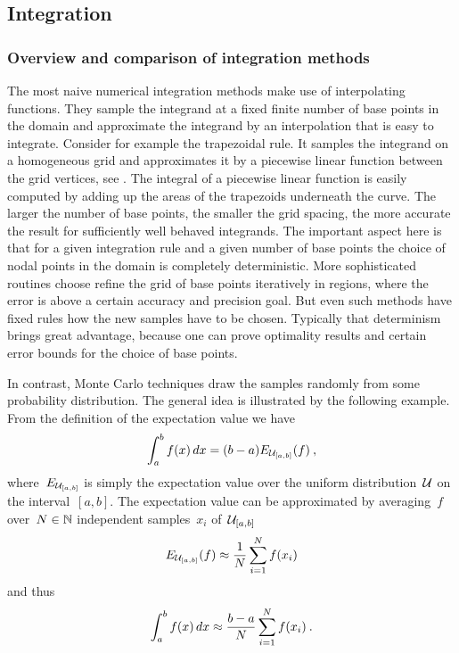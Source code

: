 \subsection{Integration}

\subsubsection{Overview and comparison of integration methods}

The most naive numerical integration methods make use of interpolating
functions. They sample the integrand at a fixed finite number of base points in
the domain and approximate the integrand by an interpolation that is easy to
integrate. Consider for example the trapezoidal rule. It samples the integrand
on a homogeneous grid and approximates it by a piecewise linear function between
the grid vertices, see . The integral of a piecewise linear
function is easily computed by adding up the areas of the trapezoids underneath
the curve. The larger the number of base points, \ie{} the smaller the grid
spacing, the more accurate the result for sufficiently well behaved integrands.
The important aspect here is that for a given integration rule and a given
number of base points the choice of nodal points in the domain is completely
deterministic. More sophisticated routines choose refine the grid of base points
iteratively in regions, where the error is above a certain accuracy and
precision goal. But even such  methods have fixed rules how
the new samples have to be chosen. Typically that determinism brings great
advantage, because one can prove optimality results and certain error bounds for
the choice of base points.

In contrast, Monte Carlo techniques draw the samples randomly from some
probability distribution. The general idea is illustrated by the following
example. From the definition of the expectation value we have
%
\begin{equation}\label{mcsimple}
  \int_a^b f(x) \,dx = (b-a) E_{\mathcal{U}_{[a,b]}}(f)\:,
\end{equation}
%
where~$E_{\mathcal{U}_{[a,b]}}$ is simply the expectation value over the uniform
distribution~$\mathcal{U}$ on the interval~$[a,b]$. The expectation value can be
approximated by averaging~$f$ over~$N \in \mathbb{N}$ independent samples~${x_i}$
of~$\mathcal{U}_{[a,b]}$
%
\begin{equation}\label{evapprox}
  E_{\mathcal{U}_{[a,b]}}(f) \approx \frac{1}{N} \sum_{i=1}^N f(x_i)
\end{equation}
%
and thus
%
\begin{equation}\label{mcsapprox}
  \int_a^b f(x) \,dx \approx \frac{b-a}{N} \sum_{i=1}^N f(x_i)\:.
\end{equation}

